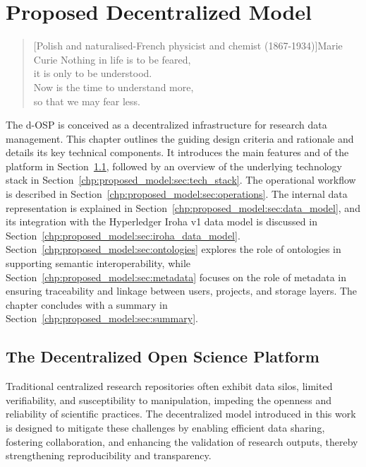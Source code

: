 \documentclass[final]{rc-book-2.14}
\begin{document}
\chapter{Proposed Decentralized Model}
\label{chp:proposed_model}

\begin{quotation}[Polish and naturalised-French physicist and chemist (1867-1934)]{Marie Curie}
    Nothing in life is to be feared, \\
    it is only to be understood. \\
    Now is the time to understand more, \\
    so that we may fear less.
\end{quotation}


\drop The d-OSP is conceived as a decentralized infrastructure for research data management. This chapter outlines the guiding design criteria and rationale and details its key technical components. It introduces the main features and of the platform in Section~\ref{chp:proposed_model:sec:osp}, followed by an overview of the underlying technology stack in Section~\ref{chp:proposed_model:sec:tech_stack}. The operational workflow is described in Section~\ref{chp:proposed_model:sec:operations}. The internal data representation is explained in Section~\ref{chp:proposed_model:sec:data_model}, and its integration with the Hyperledger Iroha v1 data model is discussed in Section~\ref{chp:proposed_model:sec:iroha_data_model}. Section~\ref{chp:proposed_model:sec:ontologies} explores the role of ontologies in supporting semantic interoperability, while Section~\ref{chp:proposed_model:sec:metadata} focuses on the role of metadata in ensuring traceability and linkage between users, projects, and storage layers. The chapter concludes with a summary in Section~\ref{chp:proposed_model:sec:summary}.

\newpage

\section{The Decentralized Open Science Platform}
\label{chp:proposed_model:sec:osp}

Traditional centralized research repositories often exhibit data silos, limited verifiability, and susceptibility to manipulation, impeding the openness and reliability of scientific practices. The decentralized model introduced in this work is designed to mitigate these challenges by enabling efficient data sharing, fostering collaboration, and enhancing the validation of research outputs, thereby strengthening reproducibility and transparency.
\end{document}

